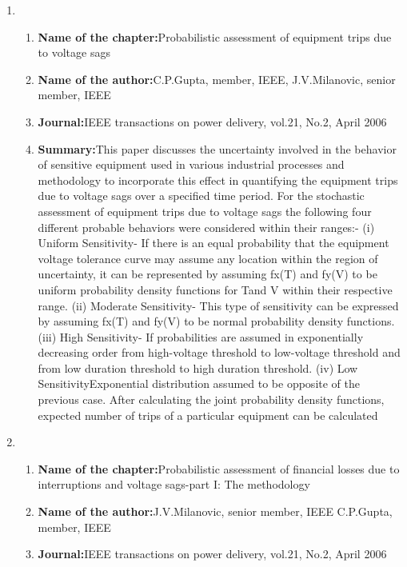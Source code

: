 \documentclass[12pt, a4paper]{extreport}
\begin{document}
\begin{enumerate}
\begin{enumerate}
    
    \end{enumerate}
    \item
    \begin{enumerate}
    \item{\textbf{Name of the chapter:}}Probabilistic
assessment of
equipment trips
due to voltage
sags
\item{\textbf{Name of the author:}}C.P.Gupta,
member, IEEE,
J.V.Milanovic,
senior member,
IEEE
\item{\textbf{Journal:}}IEEE
transactions
on power
delivery,
vol.21, No.2,
April 2006
\item{\textbf{Summary:}}This paper discusses the
uncertainty involved in the
behavior of sensitive
equipment used in various
industrial processes and
methodology to
incorporate this effect in
quantifying the equipment
trips due to voltage sags
over a specified time
period. For the stochastic
assessment of equipment
trips due to voltage sags
the following four
different probable
behaviors were considered
within their ranges:-
(i) Uniform Sensitivity- If
there is an equal
probability that the
equipment voltage
tolerance curve may
assume any location
within the region of
uncertainty, it can be represented by assuming
fx(T) and fy(V) to be
uniform probability
density functions for Tand
V within their respective
range. (ii) Moderate
Sensitivity- This type of
sensitivity can be
expressed by assuming
fx(T) and fy(V) to be
normal probability density
functions. (iii) High
Sensitivity- If probabilities
are assumed in
exponentially decreasing
order from high-voltage
threshold to low-voltage
threshold and from low
duration threshold to high
duration threshold. (iv)
Low SensitivityExponential
distribution
assumed to be opposite of
the previous case. After
calculating the joint
probability density
functions, expected
number of trips of a
particular equipment can be calculated
    \end{enumerate}
    \item
    \begin{enumerate}
     \item{\textbf{Name of the chapter:}}Probabilistic
assessment of
financial losses
due to
interruptions
and voltage
sags-part I: The
methodology
\item{\textbf{Name of the author:}}J.V.Milanovic,
senior member,
IEEE
C.P.Gupta,
member, IEEE
\item{\textbf{Journal:}}IEEE
transactions
on power
delivery,
vol.21, No.2,
April 2006


\end{enumerate}
\end{enumerate}
\end{document}
